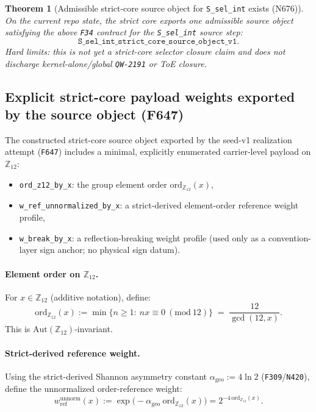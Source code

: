 \documentclass[11pt,a4paper]{article}
\newtheorem{theorem}{Theorem}[section]
\begin{document}
\begin{theorem}[Admissible strict-core source object for \texttt{S\_sel\_int} exists (N676)]
On the current repo state, the strict core exports one admissible source object satisfying the above \texttt{F34} contract for the \texttt{S\_sel\_int} source step:
\[
\texttt{S\_sel\_int\_strict\_core\_source\_object\_v1}.
\]
\emph{Hard limits:} this is not yet a strict-core selector closure claim and does not discharge kernel-alone/global \texttt{QW-2191} or ToE closure.
\end{theorem}

\subsection{Explicit strict-core payload weights exported by the source object (F647)}
\label{sec:f647_payload}

The constructed strict-core source object exported by the seed-v1 realization attempt (\texttt{F647}) includes a minimal, explicitly enumerated
carrier-level payload on $\mathbb{Z}_{12}$:
\begin{itemize}
  \item \texttt{ord\_z12\_by\_x}: the group element order $\mathrm{ord}_{\mathbb{Z}_{12}}(x)$,
  \item \texttt{w\_ref\_unnormalized\_by\_x}: a strict-derived element-order reference weight profile,
  \item \texttt{w\_break\_by\_x}: a reflection-breaking weight profile (used only as a convention-layer sign anchor; no physical sign datum).
\end{itemize}

\paragraph{Element order on $\mathbb{Z}_{12}$.}
For $x\in\mathbb{Z}_{12}$ (additive notation), define:
\[
\mathrm{ord}_{\mathbb{Z}_{12}}(x)
:=
\min\{n\ge 1:\ n x \equiv 0\ (\mathrm{mod}\ 12)\}
\;=\;
\frac{12}{\gcd(12,x)}.
\]
This is $\mathrm{Aut}(\mathbb{Z}_{12})$-invariant.

\paragraph{Strict-derived reference weight.}
Using the strict-derived Shannon asymmetry constant $\alpha_{\mathrm{geo}}:=4\ln 2$ (\texttt{F309}/\texttt{N420}),
define the unnormalized order-reference weight:
\[
w_{\mathrm{ref}}^{\mathrm{unnorm}}(x)
:=
\exp\!\bigl(-\alpha_{\mathrm{geo}}\ \mathrm{ord}_{\mathbb{Z}_{12}}(x)\bigr)
=
2^{-4\,\mathrm{ord}_{\mathbb{Z}_{12}}(x)}.
\]
\end{document}
